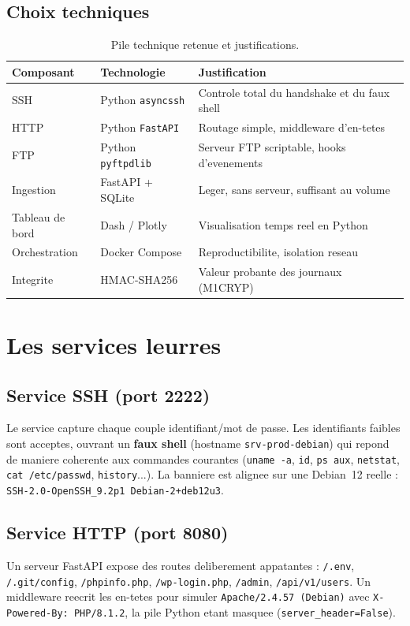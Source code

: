 \documentclass[11pt,a4paper]{article}
\begin{document}
\subsection{Choix techniques}
\begin{table}[h]\centering\small
\renewcommand{\arraystretch}{1.2}
\begin{tabular}{@{}lll@{}}
\toprule
\rowcolor{primary!8}\textbf{Composant} & \textbf{Technologie} & \textbf{Justification} \\
\midrule
SSH & Python \texttt{asyncssh} & Controle total du handshake et du faux shell \\
HTTP & Python \texttt{FastAPI} & Routage simple, middleware d'en-tetes \\
FTP & Python \texttt{pyftpdlib} & Serveur FTP scriptable, hooks d'evenements \\
Ingestion & FastAPI + SQLite & Leger, sans serveur, suffisant au volume \\
Tableau de bord & Dash / Plotly & Visualisation temps reel en Python \\
Orchestration & Docker Compose & Reproductibilite, isolation reseau \\
Integrite & HMAC-SHA256 & Valeur probante des journaux (M1CRYP) \\
\bottomrule
\end{tabular}
\caption{Pile technique retenue et justifications.}
\end{table}

\section{Les services leurres}
\subsection{Service SSH (port 2222)}
Le service capture chaque couple identifiant/mot de passe. Les identifiants faibles sont
acceptes, ouvrant un \textbf{faux shell} (hostname \texttt{srv-prod-debian}) qui repond
de maniere coherente aux commandes courantes (\texttt{uname~-a}, \texttt{id},
\texttt{ps~aux}, \texttt{netstat}, \texttt{cat~/etc/passwd}, \texttt{history}...). La
banniere est alignee sur une Debian~12 reelle : \texttt{SSH-2.0-OpenSSH\_9.2p1
Debian-2+deb12u3}.

\subsection{Service HTTP (port 8080)}
Un serveur FastAPI expose des routes deliberement appatantes : \texttt{/.env},
\texttt{/.git/config}, \texttt{/phpinfo.php}, \texttt{/wp-login.php}, \texttt{/admin},
\texttt{/api/v1/users}. Un middleware reecrit les en-tetes pour simuler
\texttt{Apache/2.4.57 (Debian)} avec \texttt{X-Powered-By: PHP/8.1.2}, la pile Python
etant masquee (\texttt{server\_header=False}).
\end{document}

